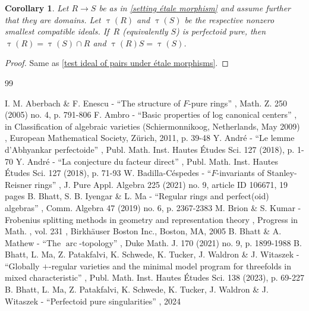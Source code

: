 \documentclass[11pt]{article}
\let\autoref\cref
\theoremstyle{plain}
\newtheorem{corollary}[theorem]{Corollary}
\theoremstyle{definition}
\numberwithin{equation}{theorem}
\begin{document}
\begin{corollary}
Let $R\to S$ be as in \autoref{setting étale morphism} and assume further that they are domains. Let $\uptau(R)$ and $\uptau(S)$ be the respective nonzero smallest compatible ideals. If~$R$ (equivalently $S$) is perfectoid pure, then $\uptau(R)=\uptau(S)\cap R$ and $\uptau(R) S=\uptau(S)$.
\end{corollary}

\begin{proof}
Same as \autoref{test ideal of pairs under étale morphisms}.
\end{proof}


\begin{thebibliography}{99}\raggedright
{} I. M. Aberbach \& F. Enescu - “The structure of $F$-pure rings” , Math. Z. 250 (2005) no. 4, p. 791-806
 F. Ambro - “Basic properties of log canonical centers” , in Classification of algebraic varieties (Schiermonnikoog, Netherlands, May 2009) , European Mathematical Society, Zürich, 2011, p. 39-48
 Y. André - “Le lemme d’Abhyankar perfectoide” , Publ. Math. Inst. Hautes Études Sci. 127 (2018), p. 1-70
 Y. André - “La conjecture du facteur direct” , Publ. Math. Inst. Hautes Études Sci. 127 (2018), p. 71-93
 W. Badilla-Céspedes - “$F$-invariants of Stanley-Reisner rings” , J. Pure Appl. Algebra 225 (2021) no. 9, article ID 106671, 19 pages
 B. Bhatt, S. B. Iyengar \& L. Ma - “Regular rings and perfect(oid) algebras” , Comm. Algebra 47 (2019) no. 6, p. 2367-2383
 M. Brion \& S. Kumar - Frobenius splitting methods in geometry and representation theory , Progress in Math. , vol. 231 , Birkhäuser Boston Inc., Boston, MA, 2005
 B. Bhatt \& A. Mathew - “The $\operatorname{arc}$-topology” , Duke Math. J. 170 (2021) no. 9, p. 1899-1988
 B. Bhatt, L. Ma, Z. Patakfalvi, K. Schwede, K. Tucker, J. Waldron \& J. Witaszek - “Globally $+$-regular varieties and the minimal model program for threefolds in mixed characteristic” , Publ. Math. Inst. Hautes Études Sci. 138 (2023), p. 69-227
 B. Bhatt, L. Ma, Z. Patakfalvi, K. Schwede, K. Tucker, J. Waldron \& J. Witaszek - “Perfectoid pure singularities” , 2024

\end{thebibliography}
\end{document}

